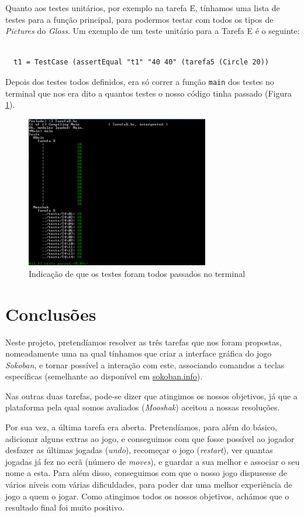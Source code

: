 \documentclass[a4paper]{article}
\begin{document}
Quanto aos testes unitários, por exemplo na tarefa E, tínhamos uma lista de testes para a função principal, para podermos testar com todos os tipos de \emph{Pictures} do \emph{Gloss}. Um exemplo de um teste unitário para a Tarefa E é o seguinte:

\begin{Verbatim}

  t1 = TestCase (assertEqual "t1" "40 40" (tarefa5 (Circle 20))

\end{Verbatim}

Depois dos testes todos definidos, era só correr a função \texttt{main} dos testes no terminal que nos era dito a quantos testes o nosso código tinha passado (Figura \ref{fig:figuratestes}).

\begin{figure}[H]
\centering
\includegraphics[width=8cm]{teste.png}
\caption{Indicação de que os testes foram todos passados no terminal}
\label{fig:figuratestes}
\end{figure}

\section{Conclusões}
\label{sec:conclusao}

Neste projeto, pretendíamos resolver as três tarefas que nos foram propostas, nomeadamente uma na qual tínhamos que criar a interface gráfica do jogo \emph{Sokoban}, e tornar possível a interação com este, associando comandos a teclas específicas (semelhante ao disponível em \href{sokoban.info}
{sokoban.info}).

Nas outras duas tarefas, pode-se dizer que atingimos os nossos objetivos, já que a plataforma pela qual somos avaliados (\emph{Mooshak}) aceitou a nossas resoluções.

Por sua vez, a última tarefa era aberta. Pretendíamos, para além do básico, adicionar alguns extras ao jogo, e conseguimos com que fosse possível ao jogador desfazer as últimas jogadas (\emph{undo}), recomeçar o jogo (\emph{restart}), ver quantas jogadas já fez no ecrã (número de \emph{moves}), e guardar a sua melhor  e associar o seu nome a esta. Para além disso, conseguimos com que o nosso jogo dispusesse de vários níveis com várias dificuldades, para poder dar uma melhor experiência de jogo a quem o jogar. Como atingimos todos os nossos objetivos, achámos que o resultado final foi muito positivo.
\end{document}
